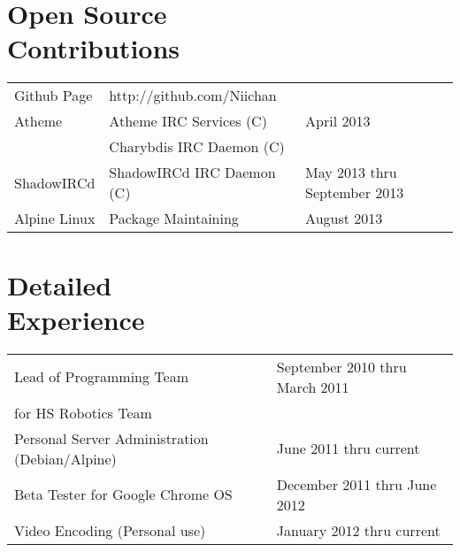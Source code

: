 \documentclass[line, margin]{res}
\begin{document}
\address{12924 SE 26th ST \\ Bellevue WA, 98005 \\ +1 (425) 221-7761}
     
\begin{resume}

\section{Open Source \\ Contributions}
\begin{tabular}{l l l}
 Github Page & \hfill http://github.com/Niichan & \\ [5pt]
 Atheme & \hfill Atheme IRC Services (C) & April 2013 \\ 
 & \hfill Charybdis IRC Daemon (C) \\ [5pt]
 ShadowIRCd & \hfill ShadowIRCd IRC Daemon (C) & May 2013 thru September 2013 \\ [5pt]
 Alpine Linux & \hfill Package Maintaining & August 2013 \\
\end{tabular}

\section{Detailed \\ Experience}
\begin{tabular}{l l}
 Lead of Programming Team & \hfill September 2010 thru March 2011 \\ 
 for HS Robotics Team & \\ [6pt]
 Personal Server Administration (Debian/Alpine) & \hfill June 2011 thru current  \\ [6pt]
 Beta Tester for Google Chrome OS & \hfill December 2011 thru June 2012 \\ [6pt]
 Video Encoding (Personal use) & January 2012 thru current \\ [6pt]
\end{tabular}
   

\end{resume}
\end{document}
